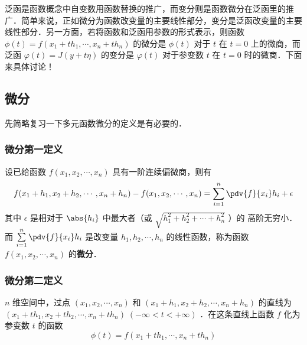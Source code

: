 
泛函是函数概念中自变数用函数替换的推广，而变分则是函数微分在泛函里的推广．简单来说，正如微分为函数改变量的主要线性部分，变分是泛函改变量的主要线性部分．另一方面，若将函数和泛函用参数的形式表示，则函数$\phi(t)=f(x_1+th_1,\cdots,x_n+th_n) $ 的微分是 $\phi(t)$ 对于 $t$ 在 $t=0$ 上的微商，而泛函 $\varphi(t)=J(y+t\eta)$ 的变分是 $\varphi(t)$ 对于参变数 $t$ 在 $t=0$ 时的微商．下面来具体讨论！
\subsection{微分}
先简略复习一下多元函数微分的定义是有必要的．
\subsubsection{微分第一定义}
设已给函数 $f(x_1,x_2,\cdots,x_n)$ 具有一阶连续偏微商，则有
\begin{equation}
f(x_1+h_1,x_2+h_2,\cdots,x_n+h_n)-f(x_1,x_2,\cdots,x_n)=\sum_{i=1}^{n} \pdv{f}{x_i}h_i+\epsilon
\end{equation}
其中 $\epsilon$ 是相对于 $\abs{h_i}$ 中最大者（或 $\sqrt{h_1^2+h_2^2+\cdots+h_n^2}$ ）的 高阶无穷小．而 $\sum\limits_{i=1}^{n} \pdv{f}{x_i}h_i$ 是改变量 $h_1,h_2,\cdots,h_n$ 的线性函数，称为函数 $f(x_1,x_2,\cdots,x_n)$ 的\textbf{微分}．
\subsubsection{微分第二定义}
$n$ 维空间中，过点 $(x_1,x_2,\cdots,x_n)$ 和 $(x_1+h_1,x_2+h_2,\cdots,x_n+h_n)$ 的直线为 $(x_1+th_1,x_2+th_2,\cdots,x_n+th_n)\;(-\infty<t<+\infty)$ ．在这条直线上函数 $f$ 化为参变数 $t$ 的函数
\begin{equation}
\phi(t)=f(x_1+th_1,\cdots,x_n+th_n) 
\end{equation}
